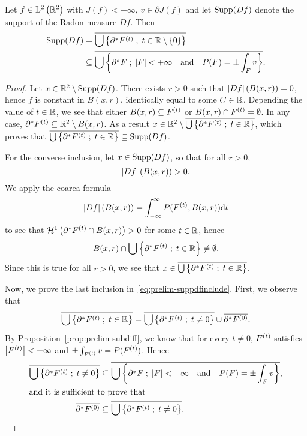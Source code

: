 \begin{prop}\label{prop:prelim-suppdf}
  Let $f\in \mathrm{L}^2\left(\mathbb{R}^2\right)$ with $J(f)<+\infty$,  $v\in \partial J(f)$ and let $\operatorname{Supp} (Df)$ denote the support of the Radon measure $Df$. Then
\begin{align}
  \label{eq:prelim-suppdfequal}  \operatorname{Supp}(Df)&=\overline{\bigcup\left\{ \partial^*F^{(t)} \;;\; t\in \mathbb{R}\setminus\{0\} \right\}}\\
 \label{eq:prelim-suppdfinclude}&\subseteq \overline{\bigcup\left\{ \partial^*F \;;\; \left| F \right|<+\infty \quad \text{and} \quad P(F)=\pm \int_F v  \right\}}. 
\end{align}
\end{prop}

\begin{proof}
  Let $x\in \mathbb{R}^2\setminus\operatorname{Supp} (Df)$. There exists $r>0$ such that $\left| Df \right|(B(x,r))=0$, hence $f$ is constant in $B(x,r)$, identically equal to some $C\in \mathbb{R}$. Depending the value of $t\in \mathbb{R}$, we see that either $B(x,r)\subseteq F^{(t)}$ or $B(x,r)\cap F^{(t)}=\emptyset$. In any case, $\partial^*F^{(t)}\subseteq \mathbb{R}^2\setminus B(x,r)$. As a result $x\in \mathbb{R}^2\setminus \overline{\bigcup\left\{ \partial^*F^{(t)} \;;\; t\in \mathbb{R} \right\}}$, which proves that $\overline{\bigcup\left\{ \partial^*F^{(t)} \;;\; t\in \mathbb{R} \right\}}\subseteq  \operatorname{Supp}(Df)$. 

  For the converse inclusion, let $x\in \operatorname{Supp}(Df)$, so that for all $r>0$, $$\left| Df \right|(B(x,r))>0.$$ We apply the coarea formula 
\begin{equation*}
  \left| Df \right|(B(x,r))= \int_{-\infty}^{\infty} P(F^{(t)},B(x,r))\mathrm{d} t
\end{equation*}
to see that $\mathcal{H}^{1}\left({\partial^*F^{(t)}\cap B(x,r)}\right)>0$ for some $t\in \mathbb{R}$, hence $$B(x,r)\cap \bigcup\left\{ \partial^*F^{(t)} \;;\; t\in \mathbb{R} \right\}\neq \emptyset.$$ Since this is true for all $r>0$, we see that $x\in \overline{\bigcup\left\{ \partial^*F^{(t)} \;;\; t\in \mathbb{R} \right\}}$.

Now, we prove the last inclusion in~\eqref{eq:prelim-suppdfinclude}. First, we observe that 
\begin{equation*}
  \overline{\bigcup\left\{ \partial^*F^{(t)} \;;\; t\in \mathbb{R} \right\}} = \overline{\bigcup\left\{ \partial^*F^{(t)} \;;\; t\neq 0 \right\}}\cup \overline{\partial^*F^{(0)}}.
\end{equation*}
By Proposition~\ref{prop:prelim-subdiff}, we know that for every $t\neq 0$, $F^{(t)}$ satisfies $\left| F^{(t)} \right|<+\infty$ and $\pm\int_{F^{(t)}}v=P(F^{(t)})$. Hence
\begin{align*}
  \overline{\bigcup\left\{ \partial^*F^{(t)} \;;\; t\neq 0 \right\}}&\subseteq \overline{\bigcup\left\{ \partial^*F \;;\; \left| F \right|<+\infty \quad \text{and} \quad P(F)=\pm \int_F v  \right\}},\\
  \intertext{and it is sufficient to prove that}
  \overline{\partial^*F^{(0)}}&\subseteq \overline{\bigcup\left\{ \partial^*F^{(t)} \;;\; t\neq 0 \right\}}.
\end{align*}


\end{proof}
